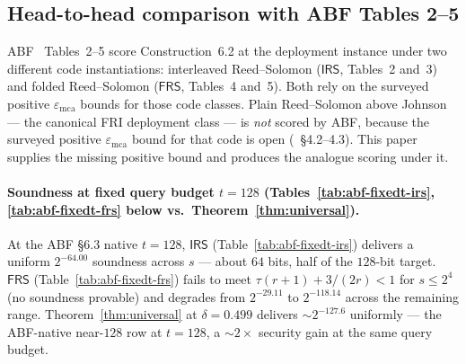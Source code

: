 \documentclass[11pt]{article}
\theoremstyle{definition}
\theoremstyle{remark}
\begin{document}
\subsection{Head-to-head comparison with ABF Tables 2--5}
\label{ssec:p0-table}

ABF~\cite{ABF} Tables~2--5 score Construction~6.2 at the deployment
instance under two different code instantiations: interleaved
Reed--Solomon ($\mathsf{IRS}$, Tables~2 and~3) and folded Reed--Solomon
($\mathsf{FRS}$, Tables~4 and~5). Both rely on the surveyed positive
$\varepsilon_{\mathrm{mca}}$ bounds for those code classes. Plain
Reed--Solomon above Johnson --- the canonical FRI deployment class ---
is \emph{not} scored by ABF, because the surveyed positive
$\varepsilon_{\mathrm{mca}}$ bound for that code is open
(\cite{ABF}~\S 4.2--4.3). This paper supplies the missing positive
bound and produces the analogue scoring under it.

\paragraph{Soundness at fixed query budget $t = 128$
(Tables~\ref{tab:abf-fixedt-irs}, \ref{tab:abf-fixedt-frs} below
vs.\ Theorem~\ref{thm:universal}).}
At the ABF \S 6.3 native $t = 128$, $\mathsf{IRS}$ (Table~\ref{tab:abf-fixedt-irs})
delivers a uniform $2^{-64.00}$ soundness across $s$ --- about $64$ bits, half
of the $128$-bit target. $\mathsf{FRS}$ (Table~\ref{tab:abf-fixedt-frs})
fails to meet $\tau(r{+}1) + 3/(2r) < 1$ for $s \leq 2^{4}$ (no soundness
provable) and degrades from $2^{-29.11}$ to $2^{-118.14}$ across the
remaining range. Theorem~\ref{thm:universal} at $\delta = 0.499$ delivers
$\sim 2^{-127.6}$ uniformly --- the ABF-native near-$128$ row at $t = 128$, a
${\sim}2{\times}$ security gain at the same query budget.
\end{document}
